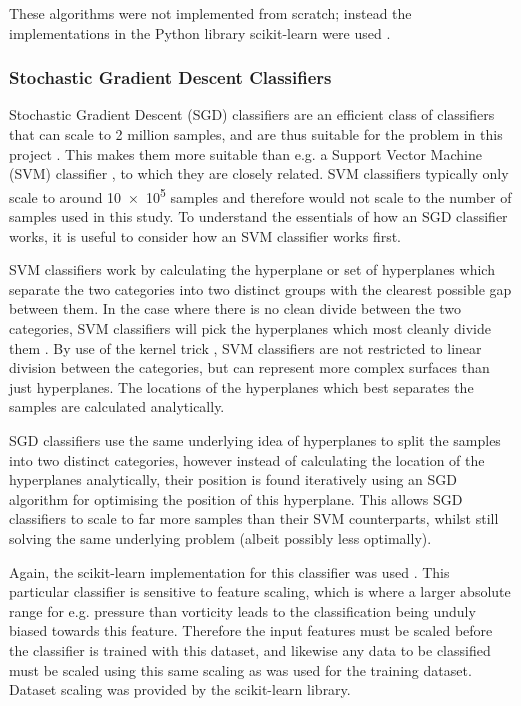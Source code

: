 \documentclass[pdftex,12pt,a4paper]{report}
\begin{document}
These algorithms were not implemented from scratch; instead the implementations in the Python
library scikit-learn were used \parencite{scikitLearn2011}.

\subsubsection{Stochastic Gradient Descent Classifiers}
Stochastic Gradient Descent (SGD) classifiers are an efficient class of classifiers that can scale
to 2 million samples, and are thus suitable for the problem in this project
\parencite{singer07pegasos, bottou2008tradeoffs}. This makes them more suitable than e.g. a Support
Vector Machine (SVM) classifier \parencite{cortes1995support}, to which they are closely related.
SVM classifiers typically only scale to around \SI{10e5}{} samples and therefore would not scale to
the number of samples used in this study. To understand the essentials of how an SGD classifier
works, it is useful to consider how an SVM classifier works first.

SVM classifiers work by calculating the hyperplane or set of hyperplanes which separate the two
categories into two distinct groups with the clearest possible gap between them. In the case where
there is no clean divide between the two categories, SVM classifiers will pick the hyperplanes which
most cleanly divide them \parencite{cortes1995support}. By use of the kernel trick
\parencite{aizerman1964theoretical}, SVM classifiers are not restricted to linear division between
the categories, but can represent more complex surfaces than just hyperplanes. The locations of the
hyperplanes which best separates the samples are calculated analytically.

SGD classifiers use the same underlying idea of hyperplanes to split the samples into two distinct
categories, however instead of calculating the location of the hyperplanes analytically, their
position is found iteratively using an SGD algorithm for optimising the position of this hyperplane.
This allows SGD classifiers to scale to far more samples than their SVM counterparts, whilst still
solving the same underlying problem (albeit possibly less optimally).

Again, the scikit-learn implementation for this classifier was used \parencite{scikitLearn2011}.
This particular classifier is sensitive to feature scaling, which is where a larger absolute range
for e.g. pressure than vorticity leads to the classification being unduly biased towards this
feature. Therefore the input features must be scaled before the classifier is trained with this
dataset, and likewise any data to be classified must be scaled using this same scaling as was used
for the training dataset. Dataset scaling was provided by the scikit-learn library.
\end{document}
